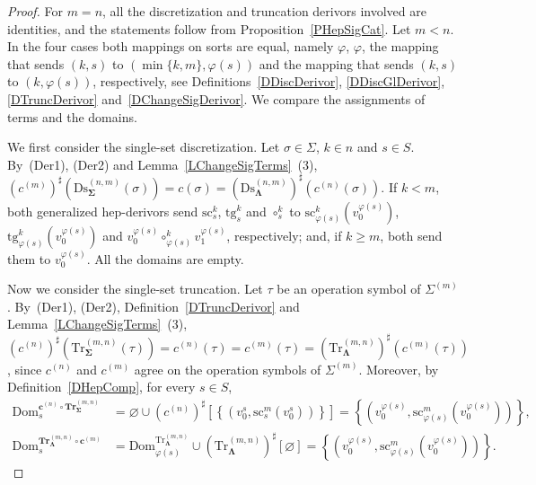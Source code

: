 \documentclass[a4paper, reqno
]{amsart}
\newcommand{\sig}[1]{\mathbf{#1}}             %
\newcommand{\Dom}{\mathrm{Dom}}
\newcommand{\src}{\mathrm{sc}}
\newcommand{\tgt}{\mathrm{tg}}
\newcommand{\Ds}{\mathrm{Ds}}
\newcommand{\Tr}{\mathrm{Tr}}
\newcommand{\bTr}{\mathbf{Tr}}
\theoremstyle{plain}
\theoremstyle{definition}
\begin{document}
\begin{proof}
For $m=n$, all the discretization and truncation derivors involved are identities, and the statements follow from Proposition~\ref{PHepSigCat}.
Let $m<n$.
In the four cases both mappings on sorts are equal, namely $\varphi$, $\varphi$, the mapping that sends $(k,s)$ to $(\min\{k,m\},\varphi(s))$ and the mapping that sends $(k,s)$ to $(k,\varphi(s))$, respectively, see Definitions~\ref{DDiscDerivor}, \ref{DDiscGlDerivor}, \ref{DTruncDerivor} and~\ref{DChangeSigDerivor}.
We compare the assignments of terms and the domains.

We first consider the single-set discretization.
Let $\sigma\in\Sigma$, $k\in n$ and $s\in S$.
By~(Der1), (Der2) and Lemma~\ref{LChangeSigTerms}~(3), $(c^{(m)})^{\sharp}(\Ds^{(n,m)}_{\sig{\Sigma}}(\sigma))=c(\sigma)=(\Ds^{(n,m)}_{\sig{\Lambda}})^{\sharp}(c^{(n)}(\sigma))$.
If $k<m$, both generalized hep-derivors send $\src^{k}_{s}$, $\tgt^{k}_{s}$ and $\circ^{k}_{s}$ to $\src^{k}_{\varphi(s)}(v^{\varphi(s)}_{0})$, $\tgt^{k}_{\varphi(s)}(v^{\varphi(s)}_{0})$ and $v^{\varphi(s)}_{0}\circ^{k}_{\varphi(s)}v^{\varphi(s)}_{1}$, respectively; and, if $k\geq m$, both send them to $v^{\varphi(s)}_{0}$.
All the domains are empty.

Now we consider the single-set truncation.
Let $\tau$ be an operation symbol of $\Sigma^{(m)}$.
By~(Der1), (Der2), Definition~\ref{DTruncDerivor} and Lemma~\ref{LChangeSigTerms}~(3), $(c^{(n)})^{\sharp}(\Tr^{(m,n)}_{\sig{\Sigma}}(\tau))=c^{(n)}(\tau)=c^{(m)}(\tau)=(\Tr^{(m,n)}_{\sig{\Lambda}})^{\sharp}(c^{(m)}(\tau))$, since $c^{(n)}$ and $c^{(m)}$ agree on the operation symbols of $\Sigma^{(m)}$.
Moreover, by Definition~\ref{DHepComp}, for every $s\in S$,
\begin{align*}
\Dom^{\mathbf{c}^{(n)}\circ\bTr^{(m,n)}_{\sig{\Sigma}}}_{s}
&=
\varnothing\cup(c^{(n)})^{\sharp}\left[\left\lbrace\left(v^{s}_{0},\src^{m}_{s}(v^{s}_{0})\right)\right\rbrace\right]
=
\left\lbrace\left(v^{\varphi(s)}_{0},\src^{m}_{\varphi(s)}(v^{\varphi(s)}_{0})\right)\right\rbrace,
\\
\Dom^{\bTr^{(m,n)}_{\sig{\Lambda}}\circ\mathbf{c}^{(m)}}_{s}
&=
\Dom^{\Tr^{(m,n)}_{\sig{\Lambda}}}_{\varphi(s)}\cup(\Tr^{(m,n)}_{\sig{\Lambda}})^{\sharp}[\varnothing]
=
\left\lbrace\left(v^{\varphi(s)}_{0},\src^{m}_{\varphi(s)}(v^{\varphi(s)}_{0})\right)\right\rbrace.
\end{align*}


\end{proof}
\end{document}
